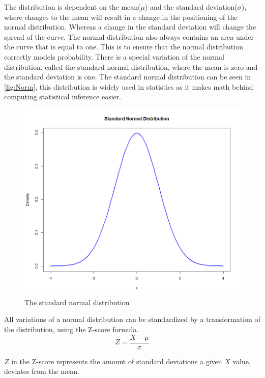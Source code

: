\noindent The distribution is dependent on the mean($\mu$) and the standard deviation($\sigma$), where changes to the mean will result in a change in the positioning of the normal distribution. Whereas a change in the standard deviation will change the spread of the curve. The normal distribution also always contains an area under the curve that is equal to one. This is to ensure that the normal distribution correctly models probability. There is a special variation of the normal distribution, called the standard normal distribution, where the mean is zero and the standard deviation is one. The standard normal distribution can be seen in \autoref{fig:Norm}, this distribution is widely used in statistics as it makes math behind computing statistical inference easier.
\begin{figure}[h!]
	\centering
	\begin{minipage}{0.80\textwidth}
		\centering
		\includegraphics[width=\linewidth]{billder/Normal distribution.png}
		\caption{The standard normal distribution}
		\label{fig:Norm}
	\end{minipage}\hfill
\end{figure}
All variations of a normal distribution can be standardized by a transformation of the distribution, using the Z-score formula.
\newline
\begin{equation}
Z=\frac{X-\mu}{\sigma}
\end{equation}


\noindent $Z$ in the Z-score represents the amount of standard deviations a given $X$ value, deviates from the mean.

